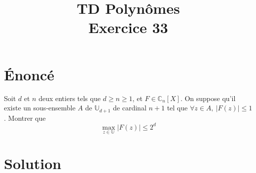 \documentclass[french]{article}
\title{TD Polynômes \\ Exercice 33}
\date{}
\newcommand{\C}{\mathbb{C}}
\newcommand{\U}{\mathbb{U}}
\begin{document}
\maketitle

\section{Énoncé}
Soit $d$ et $n$ deux entiers tels que $d\geqslant n\geqslant 1$, et $F\in\C_n[X]$. On suppose qu'il existe un sous-ensemble $A$ de $\U_{d+1}$ de cardinal $n+1$ tel que $\forall z\in A,\ \lvert F(z)\rvert\leqslant 1$. Montrer que $$\max_{z\in\U}\lvert F(z)\rvert\leqslant 2^d$$
\section{Solution}
\end{document}
